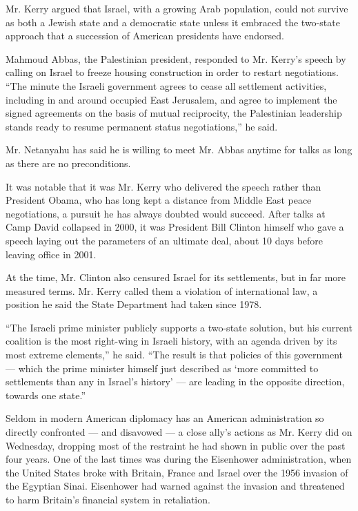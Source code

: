 Mr. Kerry argued that Israel, with a growing Arab population, could not
survive as both a Jewish state and a democratic state unless it embraced
the two-state approach that a succession of American presidents have
endorsed.

Mahmoud Abbas, the Palestinian president, responded to Mr. Kerry's
speech by calling on Israel to freeze housing construction in order to
restart negotiations. ``The minute the Israeli government agrees to
cease all settlement activities, including in and around occupied East
Jerusalem, and agree to implement the signed agreements on the basis of
mutual reciprocity, the Palestinian leadership stands ready to resume
permanent status negotiations,'' he said.

Mr. Netanyahu has said he is willing to meet Mr. Abbas anytime for talks
as long as there are no preconditions.

It was notable that it was Mr. Kerry who delivered the speech rather
than President Obama, who has long kept a distance from Middle East
peace negotiations, a pursuit he has always doubted would succeed. After
talks at Camp David collapsed in 2000, it was President Bill Clinton
himself who gave a speech laying out the parameters of an ultimate deal,
about 10 days before leaving office in 2001.

At the time, Mr. Clinton also censured Israel for its settlements, but
in far more measured terms. Mr. Kerry called them a violation of
international law, a position he said the State Department had taken
since 1978.

``The Israeli prime minister publicly supports a two-state solution, but
his current coalition is the most right-wing in Israeli history, with an
agenda driven by its most extreme elements,'' he said. ``The result is
that policies of this government --- which the prime minister himself
just described as `more committed to settlements than any in Israel's
history' --- are leading in the opposite direction, towards one state.''

Seldom in modern American diplomacy has an American administration so
directly confronted --- and disavowed --- a close ally's actions as Mr.
Kerry did on Wednesday, dropping most of the restraint he had shown in
public over the past four years. One of the last times was during the
Eisenhower administration, when the United States broke with Britain,
France and Israel over the 1956 invasion of the Egyptian Sinai.
Eisenhower had warned against the invasion and threatened to harm
Britain's financial system in retaliation.

